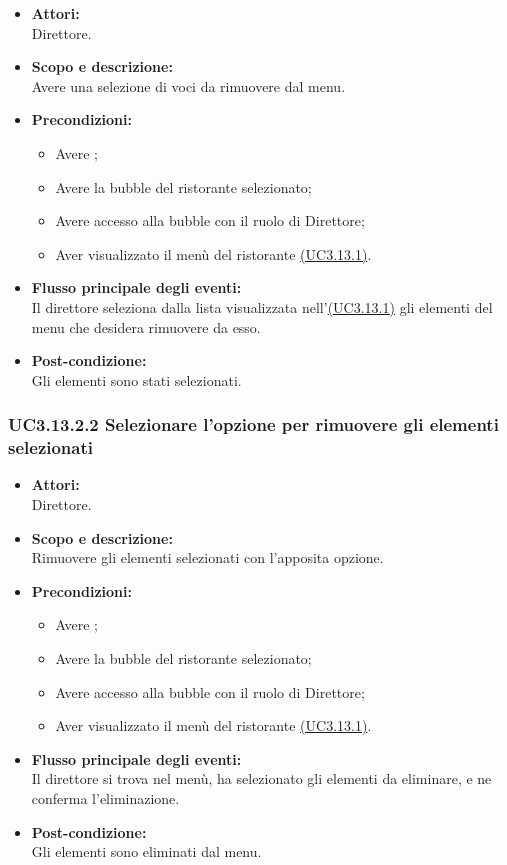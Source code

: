 \begin{itemize}
	\item \textbf{Attori:}
	\\Direttore.
	\item \textbf{Scopo e descrizione:} 
	\\Avere una selezione di voci da rimuovere dal menu.
	\item \textbf{Precondizioni:}
	\begin{itemize}
		\item Avere ;
		\item Avere la bubble del ristorante selezionato;
		\item Avere accesso alla bubble con il ruolo di Direttore;
		\item Aver visualizzato il menù del ristorante \hyperref[UC3.13.1]{(UC3.13.1)}.
	\end{itemize}
	\item \textbf{Flusso principale degli eventi:}
	\\Il direttore seleziona dalla lista visualizzata nell'\hyperref[UC3.13.1]{(UC3.13.1)} gli elementi del menu che desidera rimuovere da esso.
	\item \textbf{Post-condizione:}
	\\Gli elementi sono stati selezionati.
\end{itemize}

\subsubsection{UC3.13.2.2 Selezionare l’opzione per rimuovere gli elementi selezionati} \label{UC3.13.2.2}

\begin{itemize}
	\item \textbf{Attori:}
	\\Direttore.
	\item \textbf{Scopo e descrizione:} 
	\\Rimuovere gli elementi selezionati con l’apposita opzione.
	\item \textbf{Precondizioni:}
	\begin{itemize}
		\item Avere ;
		\item Avere la bubble del ristorante selezionato;
		\item Avere accesso alla bubble con il ruolo di Direttore;
		\item Aver visualizzato il menù del ristorante \hyperref[UC3.13.1]{(UC3.13.1)}.
	\end{itemize}
	\item \textbf{Flusso principale degli eventi:}
	\\Il direttore si trova nel menù, ha selezionato gli elementi da eliminare, e ne conferma l’eliminazione.
	\item \textbf{Post-condizione:}
	\\Gli elementi sono eliminati dal menu.
\end{itemize}

